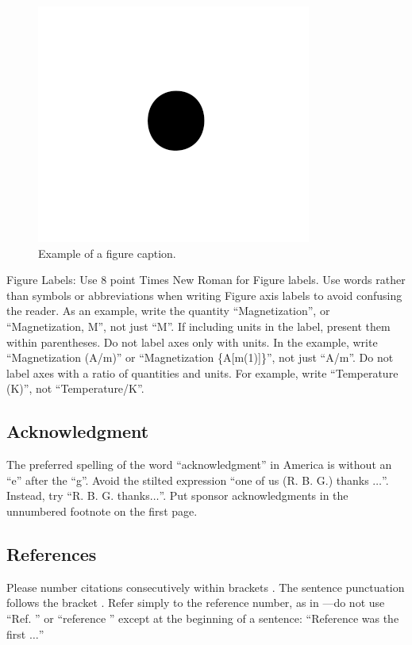 \documentclass[conference]{IEEEtran}
\begin{document}
\begin{figure}[htbp]
\centerline{\includegraphics{fig1.png}}
\caption{Example of a figure caption.}
\label{fig}
\end{figure}

Figure Labels: Use 8 point Times New Roman for Figure labels. Use words 
rather than symbols or abbreviations when writing Figure axis labels to 
avoid confusing the reader. As an example, write the quantity 
``Magnetization'', or ``Magnetization, M'', not just ``M''. If including 
units in the label, present them within parentheses. Do not label axes only 
with units. In the example, write ``Magnetization (A/m)'' or ``Magnetization 
\{A[m(1)]\}'', not just ``A/m''. Do not label axes with a ratio of 
quantities and units. For example, write ``Temperature (K)'', not 
``Temperature/K''.

\subsection*{Acknowledgment}

The preferred spelling of the word ``acknowledgment'' in America is without 
an ``e'' after the ``g''. Avoid the stilted expression ``one of us (R. B. 
G.) thanks $\ldots$''. Instead, try ``R. B. G. thanks$\ldots$''. Put sponsor 
acknowledgments in the unnumbered footnote on the first page.

\subsection*{References}

Please number citations consecutively within brackets \cite{bayesian_vsr_2014}. The 
sentence punctuation follows the bracket \cite{b2}. Refer simply to the reference 
number, as in \cite{bayesian_vsr_2014}---do not use ``Ref. \cite{bayesian_vsr_2014}'' or ``reference \cite{bayesian_vsr_2014}'' except at 
the beginning of a sentence: ``Reference \cite{bayesian_vsr_2014} was the first $\ldots$''
\end{document}

